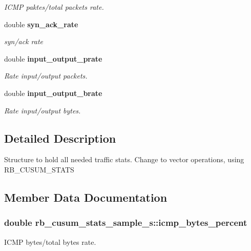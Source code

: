 \begin{DoxyCompactItemize}
\begin{DoxyCompactList}\small\item\em I\+C\+M\+P paktes/total packets rate. \end{DoxyCompactList}\item 
double {\bf syn\+\_\+ack\+\_\+rate}
\begin{DoxyCompactList}\small\item\em syn/ack rate \end{DoxyCompactList}\item 
double {\bf input\+\_\+output\+\_\+prate}
\begin{DoxyCompactList}\small\item\em Rate input/output packets. \end{DoxyCompactList}\item 
double {\bf input\+\_\+output\+\_\+brate}
\begin{DoxyCompactList}\small\item\em Rate input/output bytes. \end{DoxyCompactList}\end{DoxyCompactItemize}


\subsection{Detailed Description}
Structure to hold all needed traffic stats.  Change to vector operations, using R\+B\+\_\+\+C\+U\+S\+U\+M\+\_\+\+S\+T\+A\+T\+S 

\subsection{Member Data Documentation}
\subsubsection[{icmp\+\_\+bytes\+\_\+percent}]{\setlength{\rightskip}{0pt plus 5cm}double rb\+\_\+cusum\+\_\+stats\+\_\+sample\+\_\+s\+::icmp\+\_\+bytes\+\_\+percent}\label{structrb__cusum__stats__sample__s_a7599a172d6a083ebfd011d50a6fa2ed1}


I\+C\+M\+P bytes/total bytes rate. 

